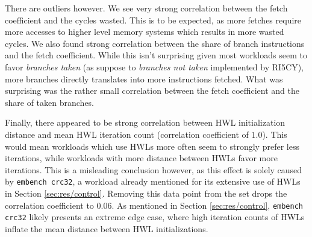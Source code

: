 \documentclass[../bachelor_paper.tex]{subfiles}
\begin{document}
There are outliers however. We see very strong correlation between the fetch coefficient and the cycles wasted. This is to be expected, as more fetches require more accesses to higher level memory systems which results in more wasted cycles. We also found strong correlation between the share of branch instructions and the fetch coefficient. While this isn't surprising given most workloads seem to favor \emph{branches taken} (as suppose to \emph{branches not taken} implemented by RI5CY), more branches directly translates into more instructions fetched. What was surprising was the rather small correlation between the fetch coefficient and the share of taken branches.

Finally, there appeared to be strong correlation between \ac{HWL} initialization distance and mean \ac{HWL} iteration count (correlation coefficient of $1.0$). This would mean workloads which use \acp{HWL} more often seem to strongly prefer less iterations, while workloads with more distance between \acp{HWL} favor more iterations. This is a misleading conclusion however, as this effect is solely caused by \texttt{embench crc32}, a workload already mentioned for its extensive use of \acp{HWL} in Section \ref{sec:res/control}. Removing this data point from the set drops the correlation coefficient to $0.06$. As mentioned in Section \ref{sec:res/control}, \texttt{embench crc32} likely presents an extreme edge case, where high iteration counts of \acp{HWL} inflate the mean distance between \ac{HWL} initializations.
\end{document}
